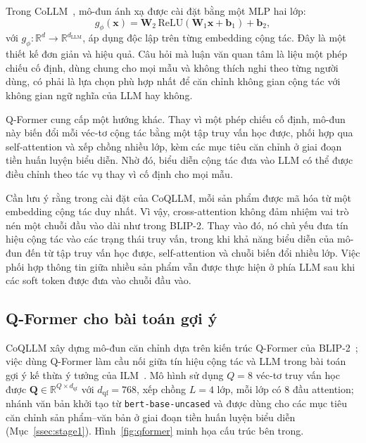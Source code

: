 Trong CoLLM~\cite{collm2023}, mô-đun ánh xạ được cài đặt bằng một MLP hai lớp:
\begin{equation*}
g_\phi(\mathbf{x}) = \mathbf{W}_2\,\mathrm{ReLU}(\mathbf{W}_1\mathbf{x} + \mathbf{b}_1)
+ \mathbf{b}_2,
\end{equation*}
với $g_\phi: \mathbb{R}^d \rightarrow \mathbb{R}^{d_{\text{LLM}}}$, áp dụng độc lập trên từng
embedding cộng tác. Đây là một thiết kế đơn giản và hiệu quả. Câu hỏi mà luận văn quan tâm là
liệu một phép chiếu cố định, dùng chung cho mọi mẫu và không thích nghi theo từng người dùng, có
phải là lựa chọn phù hợp nhất để căn chỉnh không gian cộng tác với không gian ngữ nghĩa của LLM
hay không.

Q-Former cung cấp một hướng khác. Thay vì một phép chiếu cố định, mô-đun này biến đổi mỗi véc-tơ
cộng tác bằng một tập truy vấn học được, phối hợp qua self-attention và xếp chồng nhiều lớp, kèm
các mục tiêu căn chỉnh ở giai đoạn tiền huấn luyện biểu diễn. Nhờ đó, biểu diễn cộng tác đưa vào
LLM có thể được điều chỉnh theo tác vụ thay vì cố định cho mọi mẫu.

Cần lưu ý rằng trong cài đặt của CoQLLM, mỗi sản phẩm được mã hóa từ một embedding cộng tác duy
nhất. Vì vậy, cross-attention không đảm nhiệm vai trò nén một chuỗi đầu vào dài như trong
BLIP-2. Thay vào đó, nó chủ yếu đưa tín hiệu cộng tác vào các trạng thái truy vấn, trong khi khả
năng biểu diễn của mô-đun đến từ tập truy vấn học được, self-attention và chuỗi biến đổi nhiều
lớp. Việc phối hợp thông tin giữa nhiều sản phẩm vẫn được thực hiện ở phía LLM sau khi các soft
token được đưa vào chuỗi đầu vào.

\subsection{Q-Former cho bài toán gợi ý}
\label{ssec:qformer-kien-truc}

CoQLLM xây dựng mô-đun căn chỉnh dựa trên kiến trúc Q-Former của BLIP-2~\cite{blip2_2023}; việc
dùng Q-Former làm cầu nối giữa tín hiệu cộng tác và LLM trong bài toán gợi ý kế thừa ý tưởng
của ILM~\cite{ilm2024}. Mô hình sử dụng $Q = 8$ véc-tơ truy vấn học được $\mathbf{Q} \in
\mathbb{R}^{Q \times d_{\text{qf}}}$ với $d_{\text{qf}} = 768$, xếp chồng $L = 4$ lớp,
mỗi lớp có $8$ đầu attention; nhánh văn bản khởi tạo từ \texttt{bert-base-uncased} và được dùng
cho các mục tiêu căn chỉnh sản phẩm--văn bản ở giai đoạn tiền huấn luyện biểu diễn
(Mục~\ref{ssec:stage1}). Hình~\ref{fig:qformer} minh họa cấu trúc bên trong.

